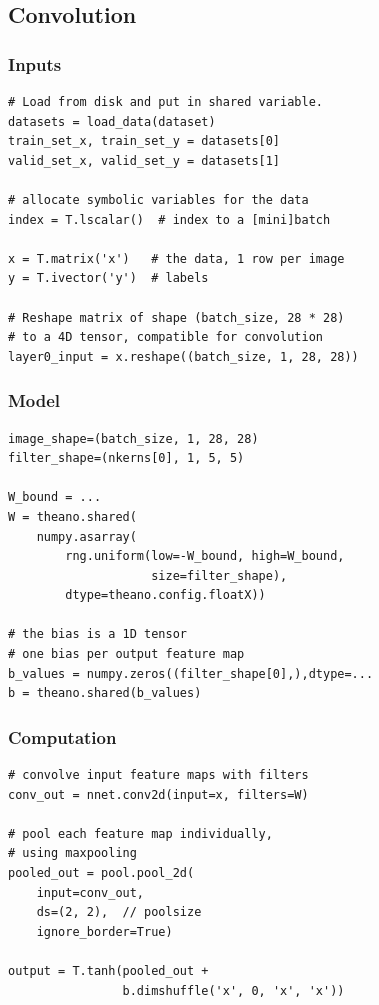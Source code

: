 \documentclass[utf8x,xcolor=pdftex,dvipsnames,table]{beamer}
\begin{document}
\subsection{Convolution}
\begin{frame}
  \tableofcontents[currentsection]
\end{frame}
\begin{frame}[fragile]
  \frametitle{Inputs}
\begin{lstlisting}
# Load from disk and put in shared variable.
datasets = load_data(dataset)
train_set_x, train_set_y = datasets[0]
valid_set_x, valid_set_y = datasets[1]

# allocate symbolic variables for the data
index = T.lscalar()  # index to a [mini]batch

x = T.matrix('x')   # the data, 1 row per image
y = T.ivector('y')  # labels

# Reshape matrix of shape (batch_size, 28 * 28)
# to a 4D tensor, compatible for convolution
layer0_input = x.reshape((batch_size, 1, 28, 28))
\end{lstlisting}
\end{frame}


\begin{frame}[fragile]
  \frametitle{Model}
\begin{lstlisting}
image_shape=(batch_size, 1, 28, 28)
filter_shape=(nkerns[0], 1, 5, 5)

W_bound = ...
W = theano.shared(
    numpy.asarray(
        rng.uniform(low=-W_bound, high=W_bound,
                    size=filter_shape),
        dtype=theano.config.floatX))

# the bias is a 1D tensor
# one bias per output feature map
b_values = numpy.zeros((filter_shape[0],),dtype=...
b = theano.shared(b_values)
\end{lstlisting}
\end{frame}


\begin{frame}[fragile]
  \frametitle{Computation}
\begin{lstlisting}
# convolve input feature maps with filters
conv_out = nnet.conv2d(input=x, filters=W)

# pool each feature map individually,
# using maxpooling
pooled_out = pool.pool_2d(
    input=conv_out,
    ds=(2, 2),  // poolsize
    ignore_border=True)

output = T.tanh(pooled_out +
                b.dimshuffle('x', 0, 'x', 'x'))
\end{lstlisting}
\end{frame}
\end{document}
